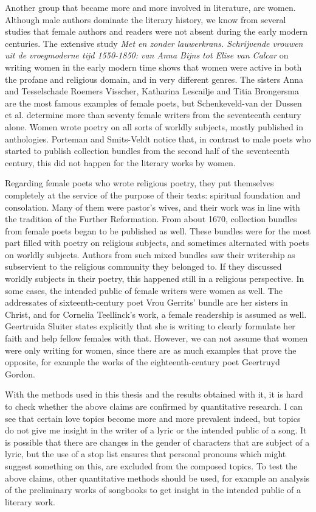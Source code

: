 Another group that became more and more involved in literature, are women. Although male authors dominate the literary history, we know from several studies that female authors and readers were not absent during the early modern centuries. The extensive study \textit{Met en zonder lauwerkrans. Schrijvende vrouwen uit de vroegmoderne tijd 1550-1850: van Anna Bijns tot Elise van Calcar} on writing women in the early modern time shows that women were active in both the profane and religious domain, and in very different genres.\autocite{schenkeveld-van_der_dussen_met_1997} The sisters Anna and Tesselschade Roemers Visscher, Katharina Lescailje and Titia Brongersma are the most famous examples of female poets, but Schenkeveld-van der Dussen et al. determine more than seventy female writers from the seventeenth century alone. Women wrote poetry on all sorts of worldly subjects, mostly published in anthologies. Porteman and Smits-Veldt notice that, in contrast to male poets who started to publish collection bundles from the second half of the seventeenth century, this did not happen for the literary works by women.

Regarding female poets who wrote religious poetry, they put themselves completely at the service of the purpose of their texts: spiritual foundation and consolation.\autocite[840]{porteman_een_2009} Many of them were pastor's wives, and their work was in line with the tradition of the Further Reformation. From about 1670, collection bundles from female poets began to be published as well. These bundles were for the most part filled with poetry on religious subjects, and sometimes alternated with poets on worldly subjects. Authors from such mixed bundles saw their writership as subservient to the religious community they belonged to. If they discussed worldly subjects in their poetry, this happened still in a religious perspective. In some cases, the intended public of female writers were women as well. The addressates of sixteenth-century poet Vrou Gerrits' bundle are her sisters in Christ, and for Cornelia Teellinck's work, a female readership is assumed as well.\autocite[51]{schenkeveld-van_der_dussen_met_1997} Geertruida Sluiter states explicitly that she is writing to clearly formulate her faith and help fellow females with that. However, we can not assume that women were only writing for women, since there are as much examples that prove the opposite, for example the works of the eighteenth-century poet Geertruyd Gordon.\autocite[840]{porteman_een_2009} 

With the methods used in this thesis and the results obtained with it, it is hard to check whether the above claims are confirmed by quantitative research. I can see that certain love topics become more and more prevalent indeed, but topics do not give me insight in the writer of a lyric or the intended public of a song. It is possible that there are changes in the gender of characters that are subject of a lyric, but the use of a stop list ensures that personal pronouns which might suggest something on this, are excluded from the composed topics. To test the above claims, other quantitative methods should be used, for example an analysis of the preliminary works of songbooks to get insight in the intended public of a literary work.

